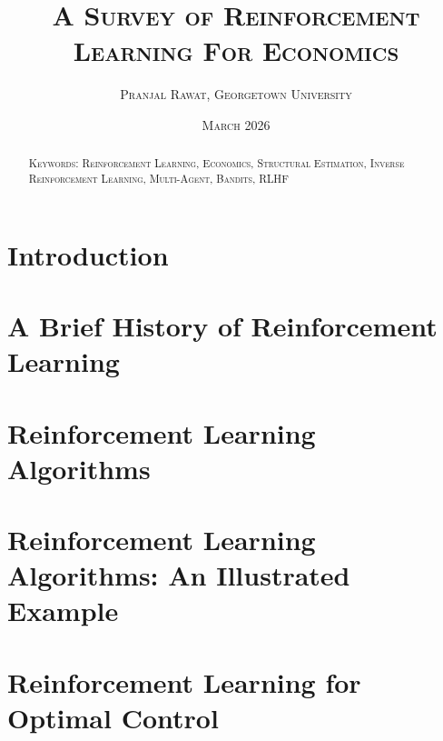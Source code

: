 \documentclass[11pt,notitlepage,a4paper]{article}
\begin{document}
\begin{titlepage}
\title{\textsc{A Survey of Reinforcement Learning For Economics}}
\author{
\textsc{Pranjal Rawat, Georgetown University}\\
}
\date{\textsc{March 2026}}

\maketitle
\thispagestyle{empty}


\begin{abstract}
\noindent

\bigskip

\noindent \textsc{Keywords: Reinforcement Learning, Economics, Structural Estimation, Inverse Reinforcement Learning, Multi-Agent, Bandits, RLHF}

\end{abstract}

\end{titlepage}


\section{Introduction}
\label{section:intro}


\section{A Brief History of Reinforcement Learning}
\label{section:history}


\section{Reinforcement Learning Algorithms}
\label{section:rl_algorithms}




\section{Reinforcement Learning Algorithms: An Illustrated Example}
\label{section:illustrated_example}


\section{Reinforcement Learning for Optimal Control}
\label{section:applications}

\end{document}
